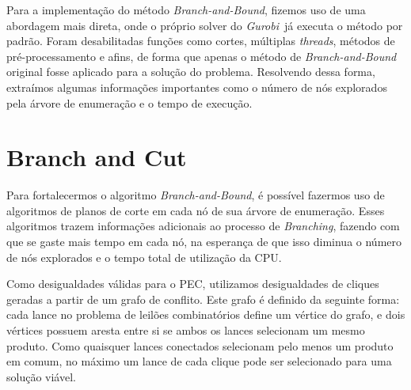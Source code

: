 \documentclass{article}
\newenvironment{algoritmo}[1][]
  {\begin{algorithm}[#1]
     \selectlanguage{brazil}%
     \floatname{algorithm}{Algoritmo}%
  }
  {\end{algorithm}}
\begin{document}
	
	Para a implementação do método \emph{Branch-and-Bound}, fizemos uso de uma abordagem mais direta, onde o próprio solver do \emph{Gurobi}\,\cite{gurobi} já executa o método por padrão. Foram desabilitadas funções como cortes, múltiplas \emph{threads}, métodos de pré-processamento e afins, de forma que apenas o método de \emph{Branch-and-Bound} original fosse aplicado para a solução do problema.
	Resolvendo dessa forma, extraímos algumas informações importantes como o número de nós explorados pela árvore de enumeração e o tempo de execução.
	
	
	
	\section{Branch and Cut}\label{sec:BC}
	Para fortalecermos o algoritmo \emph{Branch-and-Bound}, é possível fazermos uso de algoritmos de planos de corte em cada nó de sua árvore de enumeração.
	Esses algoritmos trazem informações adicionais ao processo de \emph{Branching},
	fazendo com que se gaste mais tempo em cada nó, na esperança de que isso diminua o número de nós explorados e o tempo total de utilização da CPU.
	
	Como desigualdades válidas para o PEC, utilizamos desigualdades de cliques geradas a partir de um grafo de conflito. Este grafo é definido da seguinte forma: cada lance no problema de leilões combinatórios define um vértice do grafo,
	e dois vértices possuem aresta entre si se ambos os lances selecionam um mesmo produto. Como quaisquer lances conectados selecionam pelo menos um produto em comum, no máximo um lance de cada clique pode ser selecionado para uma solução viável.
	

            
\end{document}
